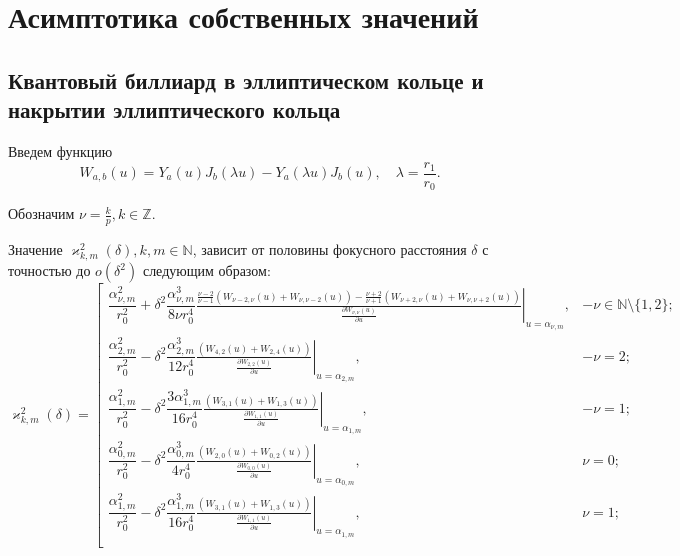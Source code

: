 \chapter{Асимптотика собственных значений}\label{ch:ch2}
\section{Квантовый биллиард в эллиптическом кольце и
накрытии эллиптического кольца}\label{sec:ch2/sec1}
Введем функцию 
\begin{equation}
W_{a, b}(u) = Y_a(u)J_b(\lambda u) - Y_a(\lambda u)J_b(u), \quad \lambda = \frac{r_1}{r_0}. 
\label{eq:YJdef}
\end{equation}

Обозначим $\nu = \frac{k}{p}, k \in \mathbb{Z}$. 
\begin{theorem}
	Значение $\varkappa^2_{k,m}(\delta), k, m \in \mathbb{N}$, зависит от половины фокусного расстояния $\delta$ с точностью до $o(\delta^2)$ следующим образом:
{\small
\begin{equation}
\varkappa^2_{k,m}(\delta) = \left[
\begin{array}{cc}
\dfrac{\alpha_{\nu, m}^2}{r_0^2} + \delta^2 \dfrac{\alpha_{\nu, m}^3}{8 \nu r_0^4} \left. \frac{
\frac{\nu-2}{\nu-1}
\left(
W_{\nu-2, \nu}(u) + W_{\nu, \nu-2}(u)
\right)- 
\frac{\nu+2}{\nu+1}
\left(
W_{\nu+2, \nu}(u) + W_{\nu, \nu+2}(u)
\right)
}{ \frac{\partial W_{\nu,\nu}(u)}{\partial u} }\right|_{u=\alpha_{\nu, m}},  & -\nu \in \mathbb{N} \setminus \{1, 2\}; \\

\dfrac{\alpha_{2, m}^2}{r_0^2} - \delta^2 \dfrac{\alpha_{2, m}^3}{12  r_0^4} \left. \frac{
	\left(
	W_{4, 2}(u) + W_{2, 4}(u)
	\right)
}{ \frac{\partial W_{2,2}(u)}{\partial u} }\right|_{u=\alpha_{2, m}}, & -\nu=2; \\

\dfrac{\alpha_{1, m}^2}{r_0^2} - \delta^2 \dfrac{3 \alpha_{1, m}^3 }{16 r_0^4}
\left. \frac{
	\left(
	W_{3, 1}(u) + W_{1, 3}(u)
	\right)
}{ \frac{\partial W_{1,1}(u)}{\partial u} }\right|_{u=\alpha_{1, m}}, & -\nu=1; \\


\dfrac{\alpha_{0, m}^2}{r_0^2} - \delta^2 \dfrac{\alpha_{0, m}^3}{4r_0^4} \left. \frac{
 \left( W_{2, 0}(u) + W_{0, 2}(u) \right)
}{ \frac{\partial W_{0,0}(u)}{\partial u} }\right|_{u=\alpha_{0, m}}, & \nu=0;   \\

\dfrac{\alpha_{1, m}^2}{r_0^2} - \delta^2 \dfrac{\alpha_{1, m}^3}{16 r_0^4} \left. \frac{ \left( W_{3, 1}(u) + W_{1, 3}(u) \right)
}{ \frac{\partial W_{1,1}(u)}{\partial u} }\right|_{u=\alpha_{1, m}},    & \nu=1;\\


\end{array}
\end{equation}}
\end{theorem}
